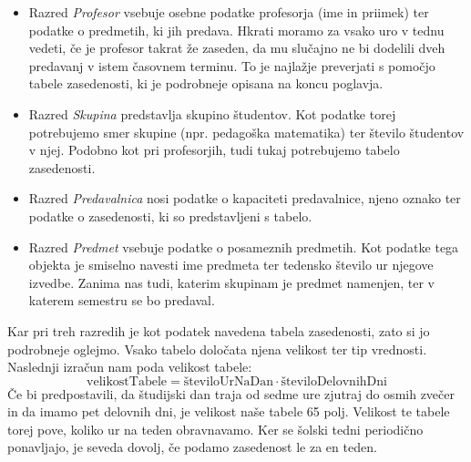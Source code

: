 \documentclass[a4paper,10pt]{article}
\begin{document}


\begin{itemize}
   \item
      Razred \emph{Profesor} vsebuje osebne podatke profesorja (ime in priimek) ter
      podatke o predmetih, ki jih predava. Hkrati moramo za vsako uro v tednu vedeti, če
      je profesor takrat že zaseden, da mu slučajno ne bi dodelili dveh predavanj v istem
      časovnem terminu. To je najlažje preverjati s pomočjo tabele zasedenosti, ki je
      podrobneje opisana na koncu poglavja.
   \item
      Razred \emph{Skupina} predstavlja skupino študentov. Kot podatke torej potrebujemo
      smer skupine (npr. pedagoška matematika) ter število študentov v njej. Podobno kot pri
      profesorjih, tudi tukaj potrebujemo tabelo zasedenosti.
   \item
      Razred \emph{Predavalnica} nosi podatke o kapaciteti predavalnice, njeno oznako
      ter podatke o zasedenosti, ki so predstavljeni s tabelo.
   \item
      Razred \emph{Predmet} vsebuje podatke o posameznih predmetih. Kot podatke tega
      objekta je smiselno navesti ime predmeta ter tedensko število ur njegove izvedbe.
      Zanima nas tudi, katerim skupinam je predmet namenjen, ter v katerem semestru se bo
      predaval.
\end{itemize}
Kar pri treh razredih je kot podatek navedena tabela zasedenosti, zato si jo podrobneje
oglejmo. Vsako tabelo določata njena velikost ter tip vrednosti. Naslednji izračun nam
poda velikost tabele:
\[
\text{velikostTabele} = \text{številoUrNaDan} \cdot \text{številoDelovnihDni}
\]
Če bi predpostavili, da študijski dan traja od sedme ure zjutraj do osmih zvečer in da
imamo pet delovnih dni, je velikost naše tabele 65 polj. Velikost te tabele torej pove,
koliko ur na teden obravnavamo. Ker se šolski tedni periodično ponavljajo, je seveda
dovolj, če podamo zasedenost le za en teden.
\end{document}
